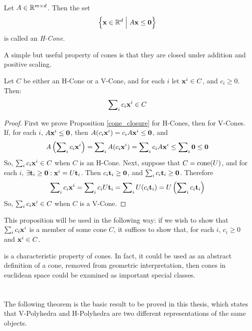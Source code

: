 \drawHPoly

\begin{Def}[H-Cone]{
		Let $A \in \mathbb{R}^{{m}\times d}$. Then the set
		\[ \left\{\mathbf{x} \in \mathbb{R}^d \;\Big|\; A\mathbf{x} \leq \mathbf{0}\right\} \]
		is called an \em{H-Cone}.
	}\end{Def}

\drawHCone

A simple but useful property of cones is that they are closed under addition and positive scaling.

\begin{Prop}\label{cone_closure}
	Let $C$ be either an H-Cone or a V-Cone, and for each $i$ let $\mathbf{x}^i \in C$, and $c_i \geq 0$.  Then:
	\[ \sum\nolimits_i c_i \mathbf{x}^i \in C \]
\end{Prop}

\begin{proof}
	First we prove Proposition \ref{cone_closure} for H-Cones, then for V-Cones.
	If, for each $i$, $A\mathbf{x}^i \leq \mathbf{0}$, then $A(c_i\mathbf{x}^i) = c_iA\mathbf{x}^i \leq \mathbf{0}$, and
	\[ A\left(\sum\nolimits_i c_i\mathbf{x}^i\right) = \sum\nolimits_i A (c_i\mathbf{x}^i) =
		\sum\nolimits_i c_i A\mathbf{x}^i \leq \sum\nolimits_i \mathbf{0} \leq \mathbf{0} \]
	So, $\sum\nolimits_i c_i\mathbf{x}^i \in C$ when $C$ is an H-Cone.  Next, suppose that $C = \operatorname{cone}(U)$, and for each $i$, $\exists \mathbf{t}_i \geq \mathbf{0}: \mathbf{x}^i = U\mathbf{t}_i$.  Then $c_i\mathbf{t}_i \geq \mathbf{0}$, and $\sum\nolimits_i c_i\mathbf{t}_i \geq \mathbf{0}$.  Therefore
	\[ \sum\nolimits_i c_i\mathbf{x}^i = \sum\nolimits_i c_i U\mathbf{t}_i = \sum\nolimits_i U(c_i\mathbf{t}_i)
		= U\left(\sum\nolimits_i c_i\mathbf{t}_i\right) \]
	So, $\sum\nolimits_i c_i\mathbf{x}^i \in C$ when $C$ is a V-Cone.
\end{proof}

This proposition will be used in the following way: if we wish to show that $\sum\nolimits_i c_i\mathbf{x}^i$ is a member of some cone $C$, it suffices to show that, for each $i$, $c_i \geq 0$ and $\mathbf{x}^i \in C$.

\begin{Remark}
 is a characteristic property of cones.  In fact, it could be used as an abstract definition of a cone, removed from geometric interpretation, then cones in euclidean space could be examined as important special classes.
\end{Remark}


\section{\MWT}

The following theorem is the basic result to be proved in this thesis, which states that V-Polyhedra and H-Polyhedra are two different representations of the same objects.

